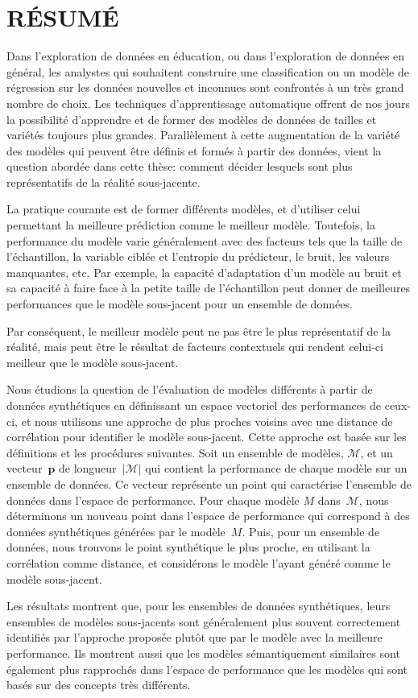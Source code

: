 \chapter*{RÉSUMÉ}\thispagestyle{headings}
Dans l'exploration de données en éducation, ou dans l'exploration de données en général, les analystes qui souhaitent construire une classification ou un modèle de régression sur les données nouvelles et inconnues sont confrontés à un très grand nombre de choix. Les techniques d'apprentissage automatique offrent de nos jours la possibilité d'apprendre et de former des modèles de données de tailles et variétés toujours plus grandes. Parallèlement à cette augmentation de la variété des modèles qui peuvent être définis et formés à partir des données, vient la question abordée dans cette thèse: comment décider lesquels sont plus représentatifs de la réalité sous-jacente.

La pratique courante est de former différents modèles, et d'utiliser celui permettant la meilleure prédiction comme le meilleur modèle. Toutefois, la performance du modèle varie généralement avec des facteurs tels que la taille de l'échantillon, la variable ciblée et l'entropie du prédicteur, le bruit, les valeurs manquantes, etc. Par exemple, la capacité d'adaptation d'un modèle au bruit et sa capacité à faire face à la petite taille de l'échantillon peut donner de meilleures performances que le modèle sous-jacent pour un ensemble de données.

Par conséquent, le meilleur modèle peut ne pas être le plus représentatif de la réalité, mais peut être le résultat de facteurs contextuels qui rendent celui-ci meilleur que le modèle sous-jacent.

Nous étudions la question de l'évaluation de modèles différents à partir de données synthétiques en définissant un espace vectoriel des performances de ceux-ci, et nous utilisons une approche de plus proches voisins avec une distance de corrélation pour identifier le modèle sous-jacent. Cette approche est basée sur les définitions et les procédures suivantes. Soit un ensemble de modèles, $\mathcal{M}$, et un vecteur~$\mathbf{p}$ de longueur~$|\mathcal{M}|$ qui contient la performance de chaque modèle sur un ensemble de données. Ce vecteur représente un point qui caractérise l'ensemble de données dans l'espace de performance. Pour chaque modèle $M$ dans~$\mathcal {M}$, nous déterminons un nouveau point dans l'espace de performance qui correspond à des données synthétiques générées par le modèle~$M$. Puis, pour un ensemble de données, nous trouvons le point synthétique le plus proche, en utilisant la corrélation comme distance, et considérons le modèle l'ayant généré comme le modèle sous-jacent.

Les résultats montrent que, pour les ensembles de données synthétiques, leurs ensembles de modèles sous-jacents sont généralement plus souvent correctement identifiés par l'approche proposée plutôt que par le modèle avec la meilleure performance. Ils montrent aussi que les modèles sémantiquement similaires sont également plus rapprochés dans l'espace de performance que les modèles qui sont basés sur des concepts très différents.